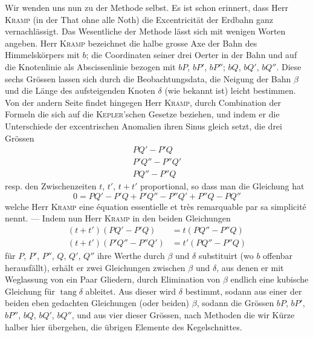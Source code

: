 Wir wenden uns nun zu der Methode selbst. Es ist schon erinnert, dass Herr \textsc{Kramp} (in der That ohne
alle Noth) die Excentricität der Erdbahn ganz vernachlässigt. Das Wesentliche der Methode lässt sich
mit wenigen Worten angeben. Herr \textsc{Kramp} bezeichnet die halbe grosse Axe der Bahn des Himmelskörpers
mit $b$; die Coordinaten seiner drei Oerter in der Bahn und auf die Knotenlinie als Abscissenlinie bezogen
mit $bP$, $bP'$, $bP''$; $bQ$, $bQ'$, $bQ''$. Diese sechs Grössen lassen sich durch die Beobachtungsdata,
die Neigung der Bahn $\beta$ und die Länge des aufsteigenden Knoten $\delta$ (wie bekannt ist) leicht
bestimmen. Von der andern Seite findet hingegen Herr \textsc{Kramp}, durch Combination der Formeln die sich
auf die \textsc{Kepler}'schen Gesetze beziehen, und indem er die Unterschiede der excentrischen Anomalien
ihren Sinus gleich setzt, die drei Grössen
\[
\begin{gathered}
PQ' - P'Q\\
P'Q'' - P''Q'\\
PQ'' - P''Q
\end{gathered}
\]
resp. den Zwischenzeiten $t$, $t'$, $t+t'$ proportional, so dass man die Gleichung hat
\[
0 = PQ' - P'Q + P'Q'' - P''Q' + P''Q - PQ''
\]
welche Herr \textsc{Kramp} eine équation essentielle et très remarquable par sa simplicité nennt. ---
Indem nun Herr \textsc{Kramp} in den beiden Gleichungen
\[
\begin{aligned}
(t+t')(PQ'-P'Q) &= t(PQ''-P''Q)\\
(t+t')(P'Q''-P''Q') &= t'(PQ''-P''Q)
\end{aligned}
\]
für $P$, $P'$, $P''$, $Q$, $Q'$, $Q''$ ihre Werthe durch $\beta$ und $\delta$ substituirt (wo $b$ offenbar
herausfällt), erhält er zwei Gleichungen zwischen $\beta$ und $\delta$, aus denen er mit Weglassung von
ein Paar Gliedern, durch Elimination von $\beta$ endlich eine kubische Gleichung für $\operatorname{tang}\delta$ ableitet.
Aus dieser wird $\delta$ bestimmt, sodann aus einer der beiden eben gedachten Gleichungen (oder beiden)
$\beta$, sodann die Grössen $bP$, $bP'$, $bP''$, $bQ$, $bQ'$, $bQ''$, und aus vier dieser Grössen, nach
Methoden die wir Kürze halber hier übergehen, die übrigen Elemente des Kegelschnittes.

